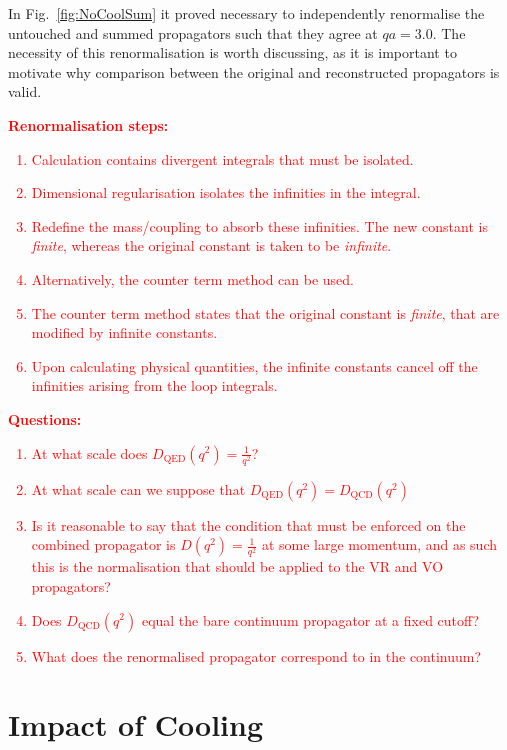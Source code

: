In Fig.~\ref{fig:NoCoolSum} it proved necessary to independently renormalise the untouched and summed propagators such that they agree at $qa=3.0$. The necessity of this renormalisation is worth discussing, as it is important to motivate why comparison between the original and reconstructed propagators is valid.

\textcolor{red}{\textbf{Renormalisation steps:}
\begin{enumerate}
\item Calculation contains divergent integrals that must be isolated.
\item Dimensional regularisation isolates the infinities in the integral.
\item Redefine the mass/coupling to absorb these infinities. The new constant is \textit{finite}, whereas the original constant is taken to be \textit{infinite}.
\item Alternatively, the counter term method can be used.
\item The counter term method states that the original constant is \textit{finite}, that are modified by infinite constants.
\item Upon calculating physical quantities, the infinite constants cancel off the infinities arising from the loop integrals.
\end{enumerate}
\textbf{Questions:}
\begin{enumerate}
\item At what scale does $D_{\text{QED}}(q^2) = \frac{1}{q^2}$?
\item At what scale can we suppose that $D_{\text{QED}}(q^2) = D_{\text{QCD}}(q^2)$
\item Is it reasonable to say that the condition that must be enforced on the combined propagator is $D(q^2) = \frac{1}{q^2}$ at some large momentum, and as such this is the normalisation that should be applied to the VR and VO propagators?
\item Does $D_{\text{QCD}}(q^2)$ equal the bare continuum propagator at a fixed cutoff?
\item What does the renormalised propagator correspond to in the continuum? 
\end{enumerate}
}

\section{Impact of Cooling}

